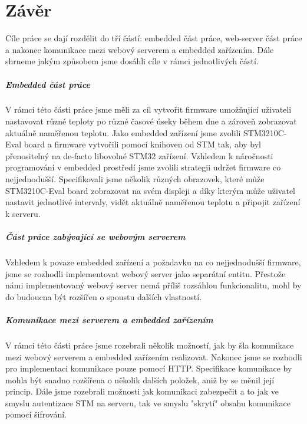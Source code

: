 \chapter*{Závěr}

Cíle práce se dají rozdělit do tří částí: embedded část práce, web-server část práce a nakonec
komunikace mezi webový serverem a embedded zařízením.
Dále shrneme jakým způsobem jsme dosáhli cíle v rámci jednotlivých částí.

\paragraph{Embedded část práce}
V rámci této části práce jsme měli za cíl vytvořit firmware umožňující uživateli nastavovat
různé teploty po různé časové úseky během dne a zároveň zobrazovat aktuálně naměřenou teplotu.
Jako embedded zařízení jsme zvolili STM3210C-Eval board a firmware vytvořili pomocí knihoven
od STM tak, aby byl přenositelný na de-facto libovolné STM32 zařízení.
Vzhledem k náročnosti programování v embedded prostředí jsme zvolili strategii udržet firmware
co nejjednodušší.
Specifikovali jsme několik různých obrazovek, které může STM3210C-Eval board zobrazovat na svém
displeji a díky kterým může uživatel nastavit jednotlivé intervaly, vidět aktuálně naměřenou teplotu a
připojit zařízení k serveru.

\paragraph{Část práce zabývající se webovým serverem}
Vzhledem k povaze embedded zařízení a požadavku na co nejjednodušší firmware, jsme se rozhodli
implementovat webový server jako separátní entitu.
Přestože námi implementovaný webový server nemá příliš rozsáhlou funkcionalitu, mohl by do budoucna
být rozšířen o spoustu dalších vlastností.

\paragraph{Komunikace mezi serverem a embedded zařízením}
V rámci této části práce jsme rozebrali několik možností, jak by šla komunikace mezi webový serverem
a embedded zařízením realizovat.
Nakonec jsme se rozhodli pro implementaci komunikace pouze pomocí HTTP.
Specifikace komunikace by mohla být snadno rozšířena o několik dalších položek, aniž by se měnil její
princip.
Dále jsme rozebrali možnosti jak komunikaci zabezpečit a to jak ve smyslu autentizace STM na serveru,
tak ve smyslu "skrytí" obsahu komunikace pomocí šifrování.


